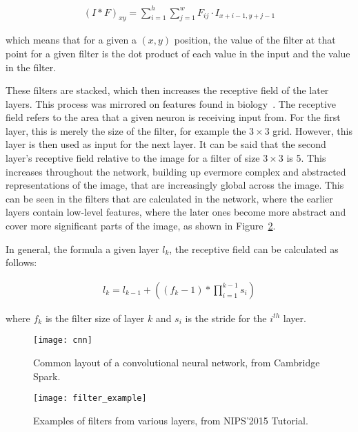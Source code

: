 \begin{align}
    {(I*F)}_{xy} = \sum^{h}_{i=1} \sum^{w}_{j=1} F_{ij} \cdot I_{x+i-1, y+j-1}
\end{align}

which means that for a given a $(x,y)$ position, the value of the filter at that
point for a given filter is the dot product of each value in the input and the
value in the filter.

These filters are stacked, which then increases the receptive field of the later
layers. This process was mirrored on features found in
biology~\cite{hubel1968receptive}. The receptive field refers to the area that a
given neuron is receiving input from. For the first layer, this is merely the
size of the filter, for example the $3 \times 3$ grid. However, this layer is
then used as input for the next layer. It can be said that the second layer's
receptive field relative to the image for a filter of size $3 \times 3$ is
5. This increases throughout the network, building up evermore complex and
abstracted representations of the image, that are increasingly global across the
image. This can be seen in the filters that are calculated in the network,
where the earlier layers contain low-level features, where the later
ones become more abstract and cover more significant parts of the image,
as shown in Figure~\ref{fig:filter_example}.

In general, the formula a given layer $l_k$, the receptive field can be
calculated as follows:

\begin{align}
    l_k = l_{k-1} + ((f_k - 1) * \prod_{i=1}^{k-1}s_i)
\end{align}

where $f_k$ is the filter size of layer $k$ and $s_i$ is the stride for the
$i^{th}$ layer.

\begin{figure}
    \centering
    \texttt{[image: cnn]}
    \caption{Common layout of a convolutional neural network, from
    Cambridge Spark\cite{cnn-layout}.}%
    \label{fig:cnn}
\end{figure}

\begin{figure}
    \centering
    \texttt{[image: filter\_example]}
    \caption{Examples of filters from various layers, from
    NIPS'2015 Tutorial\cite{filterexample}.}%
    \label{fig:filter_example}
\end{figure}

